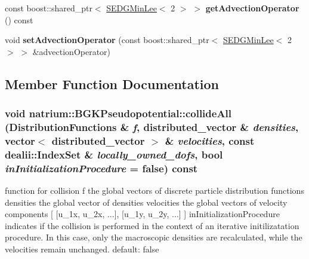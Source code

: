 \begin{DoxyCompactItemize}
\item 
\hypertarget{classnatrium_1_1BGKPseudopotential_a172e7c21baea94559de37c9a6fcf1c24}{
const boost::shared\_\-ptr$<$ \hyperlink{classnatrium_1_1SEDGMinLee}{SEDGMinLee}$<$ 2 $>$ $>$ {\bfseries getAdvectionOperator} () const }
\label{classnatrium_1_1BGKPseudopotential_a172e7c21baea94559de37c9a6fcf1c24}

\item 
\hypertarget{classnatrium_1_1BGKPseudopotential_a0cc62c6d39ac798e7eeb3bd27f3858cb}{
void {\bfseries setAdvectionOperator} (const boost::shared\_\-ptr$<$ \hyperlink{classnatrium_1_1SEDGMinLee}{SEDGMinLee}$<$ 2 $>$ $>$ \&advectionOperator)}
\label{classnatrium_1_1BGKPseudopotential_a0cc62c6d39ac798e7eeb3bd27f3858cb}

\end{DoxyCompactItemize}


\subsection{Member Function Documentation}
\hypertarget{classnatrium_1_1BGKPseudopotential_a5f40f5076273f9ec38f3078c891b453c}{
\subsubsection[{collideAll}]{\setlength{\rightskip}{0pt plus 5cm}void natrium::BGKPseudopotential::collideAll ({\bf DistributionFunctions} \& {\em f}, \/  distributed\_\-vector \& {\em densities}, \/  vector$<$ distributed\_\-vector $>$ \& {\em velocities}, \/  const dealii::IndexSet \& {\em locally\_\-owned\_\-dofs}, \/  bool {\em inInitializationProcedure} = {\ttfamily false}) const}}
\label{classnatrium_1_1BGKPseudopotential_a5f40f5076273f9ec38f3078c891b453c}


function for collision f the global vectors of discrete particle distribution functions densities the global vector of densities velocities the global vectors of velocity components \mbox{[} \mbox{[}u\_\-1x, u\_\-2x, ...\mbox{]}, \mbox{[}u\_\-1y, u\_\-2y, ...\mbox{]} \mbox{]} inInitializationProcedure indicates if the collision is performed in the context of an iterative initilizatation procedure. In this case, only the macroscopic densities are recalculated, while the velocities remain unchanged. default: false 

